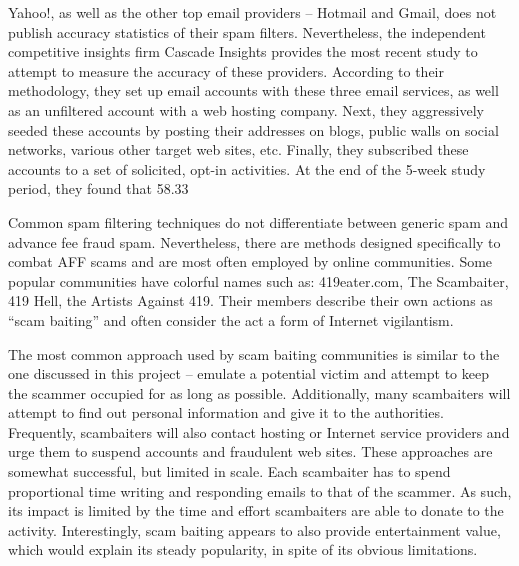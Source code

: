 Yahoo!, as well as the other top email providers – Hotmail and Gmail, does not publish accuracy statistics of their spam filters. Nevertheless, the independent competitive insights firm Cascade Insights provides the most recent study to attempt to measure the accuracy of these providers. According to their methodology, they set up email accounts with these three email services, as well as an unfiltered account with a web hosting company. Next, they aggressively seeded these accounts by posting their addresses on blogs, public walls on social networks, various other target web sites, etc. Finally, they subscribed these accounts to a set of solicited, opt-in activities. At the end of the 5-week study period, they found that 58.33%

Common spam filtering techniques do not differentiate between generic spam and advance fee fraud spam. Nevertheless, there are methods designed specifically to combat AFF scams and are most often employed by online communities. Some popular communities have colorful names such as: 419eater.com, The Scambaiter, 419 Hell, the Artists Against 419. Their members describe their own actions as “scam baiting” and often consider the act a form of Internet vigilantism. 

The most common approach used by scam baiting communities is similar to the one discussed in this project – emulate a potential victim and attempt to keep the scammer occupied for as long as possible. Additionally, many scambaiters will attempt to find out personal information and give it to the authorities. Frequently, scambaiters will also contact hosting or Internet service providers and urge them to suspend accounts and fraudulent web sites. These approaches are somewhat successful, but limited in scale. Each scambaiter has to spend proportional time writing and responding emails to that of the scammer. As such, its impact is limited by the time and effort scambaiters are able to donate to the activity. Interestingly, scam baiting appears to also provide entertainment value, which would explain its steady popularity, in spite of its obvious limitations.

